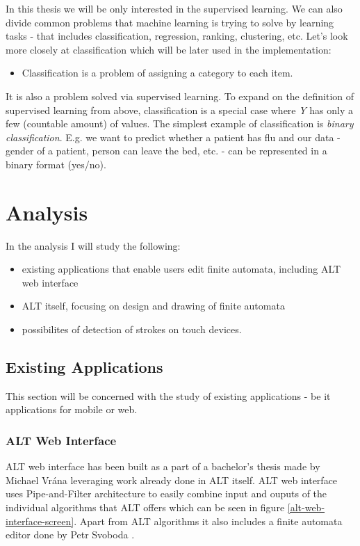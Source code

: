 In this thesis we will be only interested in the supervised learning. We can also divide common problems that machine learning is trying to solve by learning tasks - that includes classification, regression, ranking, clustering, etc. Let's look more closely at classification which will be later used in the implementation:
\begin{itemize}
    \item Classification is a problem of assigning a category to each item.
\end{itemize}
It is also a problem solved via supervised learning. To expand on the definition of supervised learning from above, classification is a special case where \textit{Y} has only a few (countable amount) of values. The simplest example of classification is \textit{binary classification}. E.g. we want to predict whether a patient has flu and our data - gender of a patient, person can leave the bed, etc. - can be represented in a binary format (yes/no).

\chapter{Analysis}
\label{chap:analysis}

In the analysis I will study the following:
\begin{itemize}
    \item existing applications that enable users edit finite automata, including ALT web interface
    \item ALT itself, focusing on design and drawing of finite automata
    \item possibilites of detection of strokes on touch devices.
\end{itemize}

\section{Existing Applications}

This section will be concerned with the study of existing applications - be it applications for mobile or web.

\subsection{ALT Web Interface}

ALT web interface has been built as a part of a bachelor's thesis made by Michael Vrána \cite{web-alt} leveraging work already done in ALT itself. ALT web interface uses Pipe-and-Filter \cite{pipe-and-filter} architecture to easily combine input and ouputs of the individual algorithms that ALT offers which can be seen in figure \ref{alt-web-interface-screen}. Apart from ALT algorithms it also includes a finite automata editor done by Petr Svoboda \cite{state-maker}.

